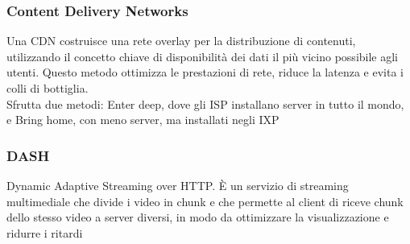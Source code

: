 \documentclass[12pt, a4paper]{article}
\begin{document}
\subsubsection*{Content Delivery Networks}
Una CDN costruisce una rete overlay per la distribuzione di contenuti, utilizzando il concetto chiave di disponibilità
dei dati il più vicino possibile agli utenti. Questo metodo ottimizza le prestazioni di rete, riduce la latenza e 
evita i colli di bottiglia.\\Sfrutta due metodi: Enter deep, dove gli ISP installano server in tutto il mondo, e Bring 
home, con meno server, ma installati negli IXP

\subsubsection*{DASH}
Dynamic Adaptive Streaming over HTTP. È un servizio di streaming multimediale che divide i video in chunk e che 
permette al client di riceve chunk dello stesso video a server diversi, in modo da ottimizzare la visualizzazione
e ridurre i ritardi
\end{document}
